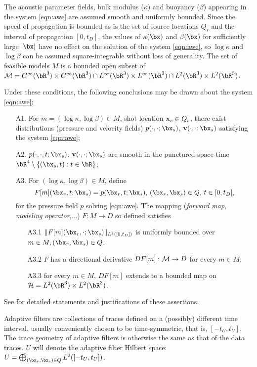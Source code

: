 The acoustic parameter fields, bulk modulus ($\kappa$) and buoyancy ($\beta$) appearing in the system \ref{eqn:awe} are assumed smooth and uniformly bounded.
Since the speed of propagation is bounded as is the set of source locations $Q_s$ and the interval of propagation $[0,t_D]$, the values of $\kappa(\bx)$ and $\beta(\bx)$ for sufficiently large $|\bx|$ have no effect on the solution of the system \ref{eqn:awe}, so $\log \kappa$ and $\log \beta$ can be assumed square-integrable without loss of generality. The set of feasible models $M$ is a  bounded open subset of ${\cal M} = C^{\infty}(\bR^3) \times C^{\infty}(\bR^3) \cap L^{\infty}(\bR^3) \times L^{\infty}(\bR^3) \cap L^2(\bR^3) \times L^2(\bR^3)$.

Under these conditions, the following conclusions may be drawn about the system \ref{eqn:awe}:
\begin{itemize}
  \item[A1. ] For $m = (\log \kappa, \log \beta) \in M$, shot location ${\bf x}_s\in Q_s$, there exist distributions (pressure and velocity fields) $p(\cdot,\cdot;\bx_s)$, ${\bf v}(\cdot,\cdot;\bx_s)$ satisfying the system \ref{eqn:awe};
  \item[A2. ] $p(\cdot,\cdot,t;\bx_s)$, ${\bf v}(\cdot,\cdot;\bx_s)$ are smooth in the punctured space-time $\bR^4 \setminus \{(\bx_s,t): t \in \bR\}$;
    \item[A3. ] For $(\log \kappa, \log \beta) \in M$, define 
\[
  F[m](\bx_r,t;\bx_s) = p(\bx_r,t;\bx_s), \, (\bx_r,\bx_s) \in Q, \, t \in [0,t_D],
\]
for the pressure field $p$ solving \ref{eqn:awe}. The mapping ({\em forward map}, {\em modeling operator},...) $F: M \rightarrow D$ so defined satisfies
\begin{itemize}
  \item[A3.1 ] $\|F[m](\bx_r,\cdot;\bx_s)\|_{L^2([0,t_D])}$ is uniformly bounded over $m \in M, (\bx_r,\bx_s) \in Q$.
  \item[A3.2 ] $F$ has a directional derivative $DF[m]: {\cal M} \rightarrow D$ for every $m \in M$;
  \item[A3.3 ] for every $m \in M$, $DF[m]$ extends to a bounded map on ${\cal H} = L^2(\bR^3) \times L^2(\bR^3)$.
  \end{itemize}
\end{itemize}
See \cite{Symes:23a} for detailed statements and justifications of these assertions.

Adaptive filters are collections of traces defined on a (possibly)
different time interval, usually conveniently chosen to be
time-symmetric, that is, $[-t_U,t_U]$. The trace geometry of adaptive
filters is otherwise the same as that of the data traces. $U$ will denote the  adaptive
filter Hilbert space: $U= \bigoplus_{(\bx_r,\bx_s) \in Q} L^2([-t_U,t_U])$.

